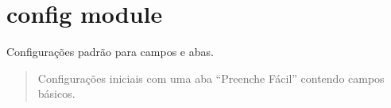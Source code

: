 \documentclass[letterpaper,10pt,english]{sphinxmanual}
\begin{document}
\sphinxstepscope


\section{config module}
\label{\detokenize{api/config:module-config}}\label{\detokenize{api/config:config-module}}\label{\detokenize{api/config::doc}}

\begin{fulllineitems}
\label{\detokenize{api/config:config.default_fields_config}}
\pysigstartsignatures
\pysiglinewithargsret
{}
{}
{}
\pysigstopsignatures
\sphinxAtStartPar
Configurações padrão para campos e abas.
\begin{quote}\begin{description}
\sphinxAtStartPar
Configurações iniciais com uma aba “Preenche Fácil” contendo campos básicos.

\sphinxAtStartPar
{}

\end{description}\end{quote}

\end{fulllineitems}

\end{document}
